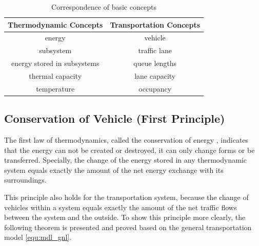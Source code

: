 \documentclass[preprint,authoryear,12pt]{elsarticle}
\begin{document}
\begin{table}[ht]
\centering \caption{Correspondence of basic concepts}
\label{tab:notions}
\begin{tabular}{cc}
  \hline
  Thermodynamic Concepts & Transportation Concepts \\
  \hline
  energy & vehicle \\
  subsystem & traffic lane \\
  energy stored in subsystems & queue lengths \\
  thermal capacity & lane capacity \\
  temperature & occupancy \\
  \hline
\end{tabular}
\end{table}

\subsection{Conservation of Vehicle (First Principle)}

The first law of thermodynamics, called the conservation of energy \citep{cengel_thermodynamics:_2001}, indicates that the energy can not be created or destroyed, it can only change forms or be transferred. Specially, the change of the energy stored in any thermodynamic system equals exactly the amount of the net energy exchange with its surroundings.

This principle also holds for the transportation system, because the change of  vehicles within a  system equals exactly the amount of the net traffic flows between the system and the outside. To show this principle more clearly, the following theorem is presented and proved based on the general transportation model \eqref{equ:mdl_gnl}.
\end{document}

